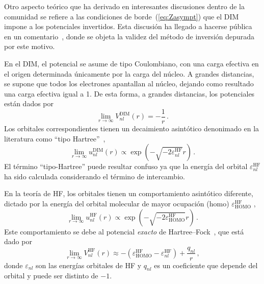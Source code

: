 Otro aspecto teórico que ha derivado en interesantes discusiones dentro 
de la comunidad se refiere a las condiciones de borde~(\ref{eq:Zasympt}) 
que el DIM impone a los potenciales invertidos. Esta discusión ha 
llegado a hacerse pública en un comentario~\cite{Cinal:19}, donde se 
objeta la validez del método de inversión depurada por este motivo.

En el DIM, el potencial se asume de tipo Coulombiano, con una carga 
efectiva en el origen determinada únicamente por la carga del núcleo. A 
grandes distancias, se supone que todos los electrones apantallan al 
núcleo, dejando como resultado una carga efectiva igual a 1. De esta 
forma, a grandes distancias, los potenciales están dados por
\begin{equation}
\lim_{r\rightarrow\infty} V_{nl}^{\mathrm{DIM}}(r) = -\frac{1}{r}\,.
\label{eq:VDIMasympt}
\end{equation}
Los orbitales correspondientes tienen un decaimiento asintótico 
denonimado en la literatura como ``tipo Hartree''~\cite{Casida:89},
\begin{equation}
\lim_{r \rightarrow \infty} u_{nl}^{\mathrm{DIM}}(r) \propto
\exp(- \sqrt{- 2 \varepsilon_{nl}^{\mathrm{HF}} } r ) \,.
\label{eq:uDIMasympt}
\end{equation}
El término ``tipo-Hartree'' puede resultar confuso ya que la energía 
del orbital $\varepsilon_{nl}^{\mathrm{HF}}$ ha sido calculada 
considerando el término de intercambio. 

En la teoría de HF, los orbitales tienen un comportamiento 
asintótico diferente, dictado por la energía del orbital molecular de 
mayor ocupación (\acs{homo}) $\varepsilon_{\mathrm{HOMO}}^{\mathrm{HF}}$ 
\cite{Handy:69,Handler:80,Ishida:92},
\begin{equation}
\lim_{r \rightarrow \infty} u_{nl}^{\mathrm{HF}}(r) \propto
\exp(- \sqrt{- 2 \varepsilon_{\mathrm{HOMO}}^{\mathrm{HF}} } r )  \, .
\label{eq:uHFasympt}
\end{equation}
Este comportamiento se debe al potencial \textit{exacto} de 
Hartree--Fock~\cite{Cinal:10}, que está dado por
\begin{equation}
\lim_{r\rightarrow\infty} V_{nl}^{\mathrm{HF}}(r) \approx
-\left(\varepsilon_{\mathrm{HOMO}}^{\mathrm{HF}}
-\varepsilon_{nl}^{\mathrm{HF}}\right)+\frac{q_{nl}}{r}\,,
\label{eq:VHFasympt}
\end{equation}
donde $\varepsilon_{nl}$ son las energías orbitales de HF y $q_{nl}$ es 
un coeficiente que depende del orbital y puede ser distinto de $-1$.

